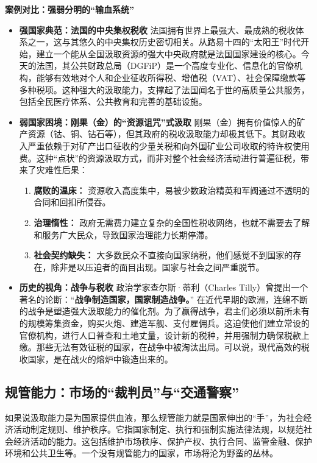 \textbf{案例对比：强弱分明的“输血系统”}

\begin{itemize}
    \item \textbf{强国家典范：法国的中央集权税收}
    法国拥有世界上最强大、最成熟的税收体系之一，这与其悠久的中央集权历史密切相关。从路易十四的“太阳王”时代开始，建立一个能从全国汲取资源的强大中央政府就是法国国家建设的核心。今天的法国，其公共财政总局（DGFiP）是一个高度专业化、信息化的官僚机构，能够有效地对个人和企业征收所得税、增值税（VAT）、社会保障缴款等多种税项。这种强大的汲取能力，支撑起了法国闻名于世的高质量公共服务，包括全民医疗体系、公共教育和完善的基础设施。
    \item \textbf{弱国家困境：刚果（金）的“资源诅咒”式汲取}
    刚果（金）拥有价值惊人的矿产资源（钴、铜、钻石等），但其政府的税收汲取能力却极其低下。其财政收入严重依赖于对矿产出口征收的少量关税和向外国矿业公司收取的特许权使用费。这种“点状”的资源汲取方式，而非对整个社会经济活动进行普遍征税，带来了灾难性后果：
    \begin{enumerate}
        \item \textbf{腐败的温床：} 资源收入高度集中，易被少数政治精英和军阀通过不透明的合同和回扣所侵吞。
        \item \textbf{治理惰性：} 政府无需费力建立复杂的全国性税收网络，也就不需要去了解和服务广大民众，导致国家治理能力长期停滞。
        \item \textbf{社会契约缺失：} 大多数民众不直接向国家纳税，他们感觉不到国家的存在，除非是以压迫者的面目出现。国家与社会之间严重脱节。
    \end{enumerate}
    \item \textbf{历史的视角：战争与税收}
    政治学家查尔斯·蒂利（Charles Tilly）曾提出一个著名的论断：“\textbf{战争制造国家，国家制造战争。}” 在近代早期的欧洲，连绵不断的战争是塑造强大汲取能力的催化剂。为了赢得战争，君主们必须以前所未有的规模筹集资金，购买火炮、建造军舰、支付雇佣兵。这迫使他们建立常设的官僚机构，进行人口普查和土地丈量，设计新的税种，并用强制力确保税款上缴。那些无法有效征税的国家，在战争中被淘汰出局。可以说，现代高效的税收国家，是在战火的熔炉中锻造出来的。
\end{itemize}

\subsection{规管能力：市场的“裁判员”与“交通警察”}

如果说汲取能力是为国家提供血液，那么规管能力就是国家伸出的“手”，为社会经济活动制定规则、维护秩序。它指国家制定、执行和强制实施法律法规，以规范社会经济活动的能力。这包括维护市场秩序、保护产权、执行合同、监管金融、保护环境和公共卫生等。一个没有规管能力的国家，市场将沦为野蛮的丛林。

